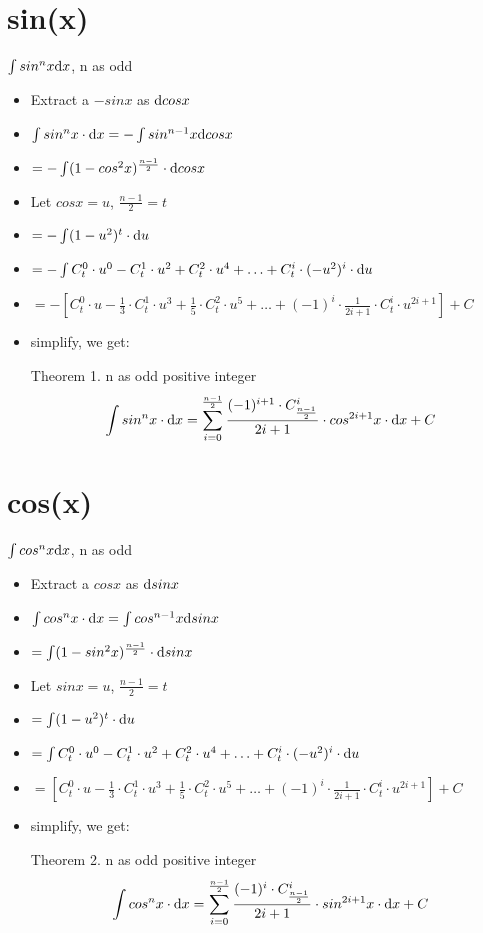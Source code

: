 \documentclass[11pt, thmnum, eqsecnum, allcites, dark]{mathbeamer}
\begin{document}
\section{sin(x)}
\begin{frame}{$\int sin^nx {\rm d}x$, n as odd}
\begin{itemize}[<+->]
\item Extract a $-sinx$ as ${\rm d}cosx$
\item $\int sin^nx \cdot {\rm d}x = - \int sin^{n-1}x {\rm d}cosx $
\item $ = - \int (1-cos^2x)^{\frac{n-1}{2}} \cdot {\rm d}cosx $
\item Let $cosx=u$, $\frac{n-1}{2}=t$
\item $ = - \int (1-u^2)^{t} \cdot {\rm d}u $
\item $ = - \int C_{t}^0 \cdot u^0 - C_{t}^1 \cdot u^2 + C_{t}^2 \cdot u^4 + \ldots + C_{t}^i \cdot (-u^2)^i \cdot {\rm d}u $
\item $ = - [C_{t}^0 \cdot u - \frac{1}{3} \cdot C_{t}^1 \cdot u^3 + \frac{1}{5} \cdot C_{t}^2 \cdot u^5 + \ldots + (-1)^i \cdot \frac{1}{2i+1} \cdot C_{t}^i \cdot u^{2i+1}] + C$
\item simplify, we get:
  \begin{block}{Theorem 1.}
\qquad n as odd positive integer
    $$\int sin^nx \cdot {\rm d}x = \sum_{i=0}^{\frac{n-1}{2}} \frac{(-1)^{i+1} \cdot C_{\frac{n-1}{2}}^{i}}{2i+1} \cdot cos^{2i+1}x \cdot {\rm d}x + C$$
  \end{block}
\end{itemize}
\end{frame}

\section{cos(x)}
\begin{frame}{$\int cos^nx {\rm d}x$, n as odd}
\begin{itemize}[<+->]
\item Extract a $cosx$ as ${\rm d}sinx$
\item $\int cos^nx \cdot {\rm d}x = \int cos^{n-1}x {\rm d}sinx $
\item $ = \int (1-sin^2x)^{\frac{n-1}{2}} \cdot {\rm d}sinx $
\item Let $sinx=u$, $\frac{n-1}{2}=t$
\item $ = \int (1-u^2)^{t} \cdot {\rm d}u $
\item $ = \int C_{t}^0 \cdot u^0 - C_{t}^1 \cdot u^2 + C_{t}^2 \cdot u^4 + \ldots + C_{t}^i \cdot (-u^2)^i \cdot {\rm d}u $
\item $ = [C_{t}^0 \cdot u - \frac{1}{3} \cdot C_{t}^1 \cdot u^3 + \frac{1}{5} \cdot C_{t}^2 \cdot u^5 + \ldots + (-1)^i \cdot \frac{1}{2i+1} \cdot C_{t}^i \cdot u^{2i+1}] + C$
\item simplify, we get:
  \begin{block}{Theorem 2.}
\qquad n as odd positive integer
    $$\int cos^nx \cdot {\rm d}x = \sum_{i=0}^{\frac{n-1}{2}} \frac{(-1)^{i} \cdot C_{\frac{n-1}{2}}^{i}}{2i+1} \cdot sin^{2i+1}x \cdot{\rm d}x + C$$
  \end{block}
\end{itemize}
\end{frame}
\end{document}
